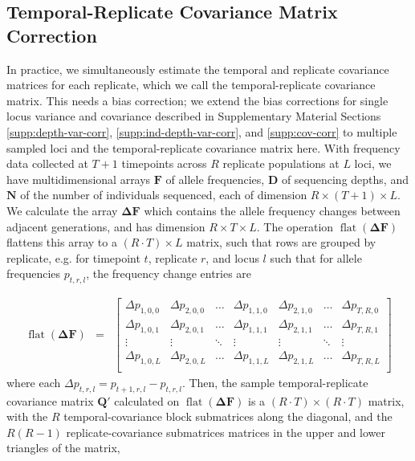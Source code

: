 \documentclass[11pt]{article}
\DeclareMathOperator{\flt}{\mathrm{flat}}
\begin{document}
\subsection{Temporal-Replicate Covariance Matrix Correction}
\label{supp:matrix-correction}

In practice, we simultaneously estimate the temporal and replicate covariance
matrices for each replicate, which we call the temporal-replicate covariance
matrix. This needs a bias correction; we extend the bias corrections for single
locus variance and covariance described in Supplementary Material Sections
\ref{supp:depth-var-corr}, \ref{supp:ind-depth-var-corr}, and
\ref{supp:cov-corr} to multiple sampled loci and the temporal-replicate
covariance matrix here. With frequency data collected at $T+1$ timepoints
across $R$ replicate populations at $L$ loci, we have multidimensional arrays
$\mathbf{F}$ of allele frequencies, $\mathbf{D}$ of sequencing depths, and
$\mathbf{N}$ of the number of individuals sequenced, each of dimension $R
\times (T+1) \times L$.  We calculate the array $\mathbf{\Delta F}$ which
contains the allele frequency changes between adjacent generations, and has
dimension $R \times T \times L$.  The operation
$\flt(\mathbf{\Delta}\mathbf{F})$ flattens this array to a $(R \cdot T) \times
L$ matrix, such that rows are grouped by replicate, e.g. for timepoint $t$,
replicate $r$, and locus $l$ such that for allele frequencies $p_{t, r, l}$,
the frequency change entries are 

\begin{align}
    \flt(\mathbf{\Delta F}) &=
                    &\begin{bmatrix} 
    \Delta p_{1, 0, 0} & \Delta p_{2, 0, 0} & \ldots & \Delta p_{1, 1, 0} & \Delta p_{2, 1, 0} & \ldots & \Delta p_{T, R, 0}  \\
    \Delta p_{1, 0, 1} & \Delta p_{2, 0, 1} & \ldots & \Delta p_{1, 1, 1} & \Delta p_{2, 1, 1} & \ldots & \Delta p_{T, R, 1}  \\
    \vdots & \vdots & \ddots & \vdots & \vdots & \ddots & \vdots  \\
    \Delta p_{1, 0, L} & \Delta p_{2, 0, L} & \ldots & \Delta p_{1, 1, L} & \Delta p_{2, 1, L} & \ldots & \Delta p_{T, R, L}  \\
  \end{bmatrix} 
\end{align}
%
where each $\Delta p_{t, r, l} = p_{t+1, r, l} - p_{t, r, l}$. Then, the sample
temporal-replicate covariance matrix $\mathbf{Q}'$ calculated on
$\flt(\mathbf{\Delta F})$ is a $(R \cdot T) \times (R \cdot T)$ matrix, with
the $R$ temporal-covariance block submatrices along the diagonal, and the
$R(R-1)$ replicate-covariance submatrices matrices in the upper and lower
triangles of the matrix,
\end{document}
